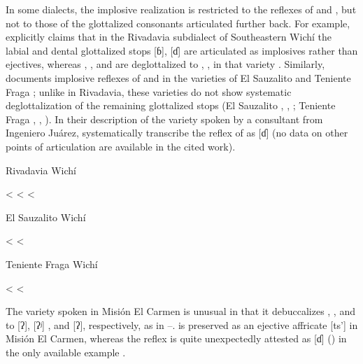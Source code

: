 In some dialects, the implosive realization is restricted to the reflexes of  and , but not to those of the glottalized consonants articulated further back. For example, \citet[34--35]{JT09-th} explicitly claims that in the Rivadavia subdialect of Southeastern Wichí the labial and dental glottalized stops [ɓ], [ɗ] are articulated as implosives rather than ejectives, whereas , , and  are deglottalized to , ,  in that variety . Similarly, \citet[128--131]{MC09} documents implosive reflexes of  and  in the varieties of El Sauzalito  and Teniente Fraga ; unlike in Rivadavia, these varieties do not show systematic deglottalization of the remaining glottalized stops (El Sauzalito , , ; Teniente Fraga , , ). In their description of the variety spoken by a consultant from Ingeniero Juárez, \citet{LCB-MBC09} systematically transcribe the reflex of  as [ɗ] (no data on other points of articulation are available in the cited work).

\ea
Rivadavia Wichí \citep{JT09-th} \label{wi:degl:riv}\\
    \begin{xlist}
        \ex {} < 
        \ex {} < 
        \ex {} < 
    \end{xlist}
\z
\ea
El Sauzalito Wichí \citep[128--131]{MC09} \label{wi:degl:elsauz}\\
    \begin{xlist}
        \ex {} < 
        \ex {} < 
    \end{xlist}
\z
\ea
Teniente Fraga Wichí \citep[128--131]{MC09} \label{wi:degl:tf}\\
    \begin{xlist}
        \ex {} < 
        \ex {} < 
    \end{xlist}
\z

The variety spoken in Misión El Carmen is unusual in that it debuccalizes , , and  to [ʔ], [ʔʲ] \recind [ˀj], and [ʔ], respectively, as in –.  is preserved as an ejective affricate [ts'] in Misión El Carmen, whereas the reflex  is quite unexpectedly attested as [ɗ] () in the only available example .

